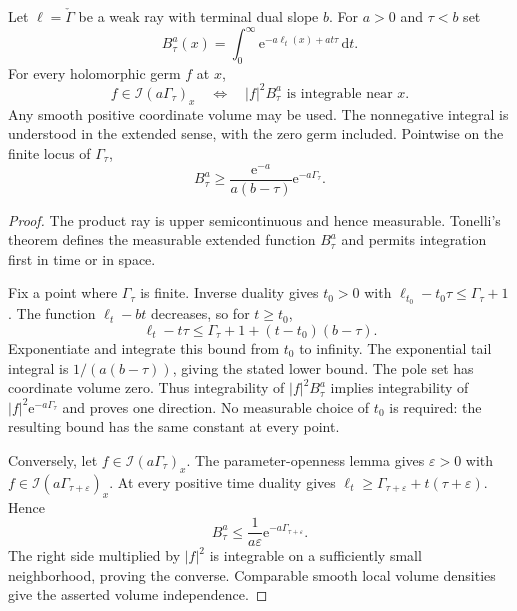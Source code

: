 \enlargethispage{3\baselineskip}
\begin{theorem}\label{thm:ray-multiplier-integral-criterion}
Let $\ell=\check\Gamma$ be a weak ray with terminal dual slope $b$. For $a>0$ and $\tau<b$ set
\[
 B^a_\tau(x)=\int_0^\infty
                         \mathrm e^{-a\ell_t(x)+at\tau}\,\mathrm dt.
\]
For every holomorphic germ $f$ at $x$,
\[
 f\in\mathcal I(a\Gamma_\tau)_x
 \quad\Longleftrightarrow\quad
             |f|^2B^a_\tau\text{ is integrable near }x.
\]
Any smooth positive coordinate volume may be used. The nonnegative integral is understood in the extended sense, with the zero germ included. Pointwise on the finite locus of $\Gamma_\tau$,
\[
 B^a_\tau\geq\frac{\mathrm e^{-a}}{a(b-\tau)}
                                      \mathrm e^{-a\Gamma_\tau}.
\]
\end{theorem}
\begin{proof}
The product ray is upper semicontinuous and hence measurable. Tonelli's theorem defines the measurable extended function $B^a_\tau$ and permits integration first in time or in space.

Fix a point where $\Gamma_\tau$ is finite. Inverse duality gives $t_0>0$ with
$\ell_{t_0}-t_0\tau\leq\Gamma_\tau+1$.
The function $\ell_t-bt$ decreases, so for $t\geq t_0$,
\[
 \ell_t-t\tau
             \leq\Gamma_\tau+1+(t-t_0)(b-\tau).
\]
Exponentiate and integrate this bound from $t_0$ to infinity. The exponential tail integral is $1/(a(b-\tau))$, giving the stated lower bound. The pole set has coordinate volume zero. Thus integrability of $|f|^2B^a_\tau$ implies integrability of $|f|^2\mathrm e^{-a\Gamma_\tau}$ and proves one direction. No measurable choice of $t_0$ is required: the resulting bound has the same constant at every point.

Conversely, let $f\in\mathcal I(a\Gamma_\tau)_x$. The parameter-openness lemma gives $\varepsilon>0$ with $f\in\mathcal I(a\Gamma_{\tau+\varepsilon})_x$. At every positive time duality gives
$\ell_t\geq\Gamma_{\tau+\varepsilon}+t(\tau+\varepsilon)$.
Hence
\[
 B^a_\tau\leq\frac1{a\varepsilon}
                                  \mathrm e^{-a\Gamma_{\tau+\varepsilon}}.
\]
The right side multiplied by $|f|^2$ is integrable on a sufficiently small neighborhood, proving the converse. Comparable smooth local volume densities give the asserted volume independence.
\end{proof}

